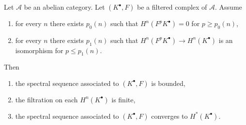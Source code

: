 \begin{lemma}
\label{lemma-ss-converges-trivial}
Let $\mathcal{A}$ be an abelian category. Let $(K^\bullet, F)$ be a
filtered complex of $\mathcal{A}$. Assume
\begin{enumerate}
\item for every $n$ there exists $p_0(n)$ such that
$H^n(F^pK^\bullet) = 0$ for $p \geq p_0(n)$,
\item for every $n$ there exists $p_1(n)$ such that
$H^n(F^pK^\bullet) \to H^n(K^\bullet)$ is an isomorphism
for $p \leq p_1(n)$.
\end{enumerate}
Then
\begin{enumerate}
\item the spectral sequence associated to $(K^\bullet, F)$ is bounded,
\item the filtration on each $H^n(K^\bullet)$ is finite,
\item the spectral sequence associated to $(K^\bullet, F)$ converges
to $H^*(K^\bullet)$.
\end{enumerate}
\end{lemma}

